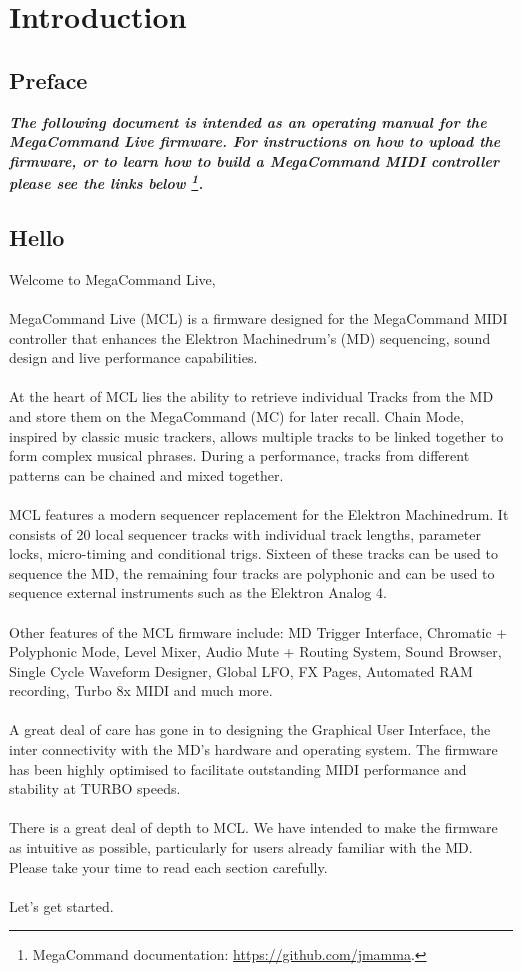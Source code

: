 \chapter{Introduction}

\section{Preface}

\begin{small}
\textbf{\textit{The following document is intended as an operating manual for the MegaCommand Live firmware. For instructions on how to upload the firmware, or to learn how to build a MegaCommand MIDI controller please see the links below \footnote{MegaCommand documentation: \url{https://github.com/jmamma}.}.}}
\end{small}

\section{Hello}
Welcome to MegaCommand Live, 
\\
\\
MegaCommand Live (MCL) is a firmware designed for the MegaCommand MIDI controller that enhances the Elektron Machinedrum's (MD) sequencing, sound design and live performance capabilities.
\\
\\
At the heart of MCL lies the ability to retrieve individual Tracks from the MD and store them on the MegaCommand (MC) for later recall. Chain Mode, inspired by classic music trackers, allows multiple tracks to be linked together to form complex musical phrases. During a performance, tracks from different patterns can be chained and mixed together.
\\
\\
MCL features a modern sequencer replacement for the Elektron Machinedrum. It consists of 20 local sequencer tracks with individual track lengths, parameter locks, micro-timing and conditional trigs. Sixteen of these tracks can be used to sequence the MD, the remaining four tracks are polyphonic and can be used to sequence external instruments such as the Elektron Analog 4. 
\\
\\
Other features of the MCL firmware include: MD Trigger Interface, Chromatic + Polyphonic Mode,  Level Mixer, Audio Mute + Routing System, Sound Browser, Single Cycle Waveform Designer, Global LFO, FX Pages, Automated RAM recording, Turbo 8x MIDI and much more.
\\
\\
A great deal of care has gone in to designing the Graphical User Interface, the inter connectivity with the MD's hardware and operating system. The firmware has been highly optimised to facilitate outstanding MIDI performance and stability at TURBO speeds.
\\
\\
There is a great deal of depth to MCL. We have intended to make the firmware as intuitive as possible, particularly for users already familiar with the MD. Please take your time to read each section carefully. 
\\
\\
Let's get started.